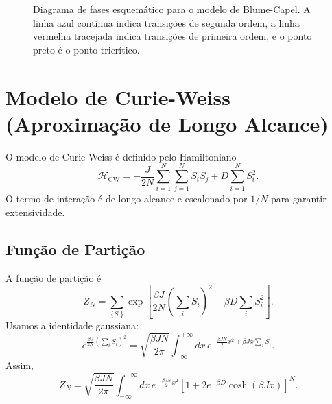 \documentclass[12pt]{article}
\begin{document}
\begin{figure}[h]
\centering
{}
\caption{Diagrama de fases esquemático para o modelo de Blume-Capel. A linha azul contínua indica transições de segunda ordem, a linha vermelha tracejada indica transições de primeira ordem, e o ponto preto é o ponto tricrítico.}
\end{figure}

\section{Modelo de Curie-Weiss (Aproximação de Longo Alcance)}

O modelo de Curie-Weiss é definido pelo Hamiltoniano
\begin{equation}
    \mathcal{H}_{\text{CW}} = -\frac{J}{2N} \sum_{i=1}^N \sum_{j=1}^N S_i S_j + D \sum_{i=1}^N S_i^2.
\end{equation}
O termo de interação é de longo alcance e escalonado por $1/N$ para garantir extensividade.

\subsection{Função de Partição}

A função de partição é
\begin{equation}
    Z_N = \sum_{\{S_i\}} \exp\left[ \frac{\beta J}{2N} \left( \sum_i S_i \right)^2 - \beta D \sum_i S_i^2 \right].
\end{equation}
Usamos a identidade gaussiana:
\begin{equation}
    e^{\frac{\beta J}{2N} (\sum_i S_i)^2} = \sqrt{\frac{\beta J N}{2\pi}} \int_{-\infty}^{+\infty} dx \, e^{-\frac{\beta J N}{2} x^2 + \beta J x \sum_i S_i}.
\end{equation}
Assim,
\begin{equation}
    Z_N = \sqrt{\frac{\beta J N}{2\pi}} \int_{-\infty}^{+\infty} dx \, e^{-\frac{\beta J N}{2} x^2} \left[ 1 + 2 e^{-\beta D} \cosh\left( \beta J x \right) \right]^N.
\end{equation}
\end{document}
